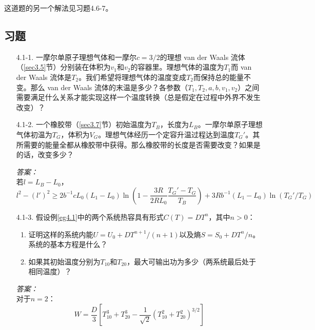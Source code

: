 这道题的另一个解法见习题4.6-7。

\subsection*{习题}
\begin{itemize}
\item[4.1-1.] 一摩尔单原子理想气体和一摩尔$c=3/2$的理想 van der Waals 流体（\ref{sec3.5}节）分别装在体积为$v_1$和$v_2$的容器里。理想气体的温度为$T_1$而 van der Waals 流体是$T_2$。我们希望将理想气体的温度变成$T_2$而保持总的能量不变。那么 van der Waals 流体的末温是多少？各参数（$T_1,T_2,a,b,v_1,v_2$）之间需要满足什么关系才能实现这样一个温度转换（总是假定在过程中外界不发生改变）？
\item[4.1-2.] 一个橡胶带（\ref{sec3.7}节）初始温度为$T_B$，长度为$L_{B}$。一摩尔单原子理想气体初温为$T_G$，体积为$V_G$。理想气体经历一个定容升温过程达到温度$T_G'$。其所需要的能量全都从橡胶带中获得。那么橡胶带的长度是否需要改变？如果是的话，改变多少？
\begin{flushright}
{\it 答案：}\\
若$l=L_B-L_0$，
\[
l^2-(l')^2\ge 2b^{-1}cL_0(L_1-L_0)\ln\left(1-\frac{3R}{2RL_0}\frac{T_G'-T_G}{T_B}\right)+3Rb^{-1}(L_1-L_0)\ln(T_G'/T_G)
\]
\end{flushright}
\item[4.1-3.] 假设例\ref{eg4.1}中的两个系统热容具有形式$C(T)=DT^n$，其中$n>0$：\\
\begin{enumerate}
\item 证明这样的系统内能$U=U_0+DT^{n+1}/(n+1)$以及熵$S=S_0+DT^n/n$。系统的基本方程是什么？
\item 如果其初始温度分别为$T_{10}$和$T_{20}$，最大可输出功为多少（两系统最后处于相同温度）？
\end{enumerate}
\begin{flushright}
{\it 答案：}\\
对于$n=2$：
\[
W=\frac{D}{3}\left[T_{10}^3+T_{20}^3-\frac{1}{\sqrt{2}}(T_{10}^2+T_{20}^2)^{3/2}\right]
\]
\end{flushright}
\end{itemize}